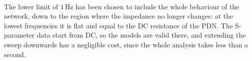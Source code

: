 \noindent\\ The lower limit of $1\,\text{Hz}$ has been chosen to include the whole behaviour of the network, down to the region where the impedance
no longer changes: at the lowest frequencies it is flat and equal to the DC resistance of the PDN. The S-parameter data start from DC, so the models
are valid there, and extending the sweep downwards has a negligible cost, since the whole analysis takes less than a second.
